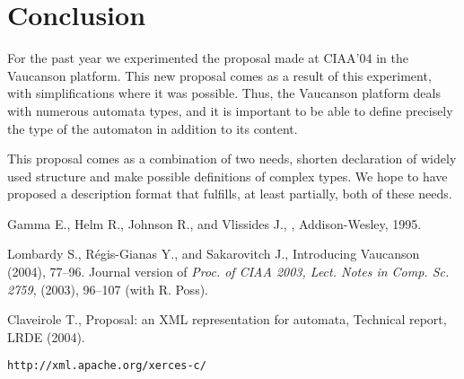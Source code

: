 \documentclass[a4paper]{llncs}
\newcommand{\Vauc}{{\sc Vaucanson}\xspace}
\begin{document}




\section{Conclusion}

For the past year we experimented the proposal made at CIAA'04 in the
\Vauc platform. This new proposal comes as a result of this
experiment, with simplifications where it was possible. Thus, the
\Vauc platform deals with numerous automata types, and it is important
to be able to define precisely the type of the automaton in addition
to its content.

This proposal comes as a combination of two needs, shorten declaration
of widely used structure and make possible definitions of complex
types. We hope to have proposed a description format that fulfills, at
least partially, both of these needs.




{\small%
\begin{thebibliography}{1}

{\sc Gamma E., Helm R., Johnson R., and Vlissides J.},
,
\newblock Addison-Wesley, 1995.

{\sc Lombardy S., R\'egis-Gianas Y., and Sakarovitch J.},
\newblock Introducing Vaucanson
 (2004), 77--96.
\newblock Journal version of 
{\em Proc. of CIAA 2003, Lect. Notes in Comp. Sc. 2759}, (2003), 
96--107 
\newblock (with {\sc R. Poss}).

{\sc Claveirole T.},
\newblock Proposal: an XML representation for automata,
\newblock Technical report, LRDE (2004).


\verb+http://xml.apache.org/xerces-c/+
\end{thebibliography}}
\end{document}
